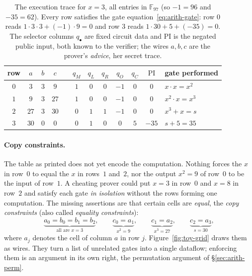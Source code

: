\documentclass[11pt,a4paper]{article}
\theoremstyle{definition}
\newcommand{\F}{\mathbb{F}}
\begin{document}
\begin{table}[htbp]
\centering
\begin{tabular}{c ccc c ccccc c l}
\toprule
row & $a$ & $b$ & $c$ & \phantom{x} & $q_M$ & $q_L$ & $q_R$ & $q_O$ & $q_C$
  & $\mathrm{PI}$ & gate performed \\
\midrule
$0$ & $3$  & $3$ & $9$
  && $1$ & $0$ & $0$ & $-1$ & $0$ & $0$   & $x \cdot x = x^2$ \\
$1$ & $9$  & $3$ & $27$
  && $1$ & $0$ & $0$ & $-1$ & $0$ & $0$   & $x^2 \cdot x = x^3$ \\
$2$ & $27$ & $3$ & $30$
  && $0$ & $1$ & $1$ & $-1$ & $0$ & $0$   & $x^3 + x = s$ \\
$3$ & $30$ & $0$ & $0$
  && $0$ & $1$ & $0$ & $0$  & $5$ & $-35$ & $s + 5 = 35$ \\
\bottomrule
\end{tabular}
\caption{The execution trace for $x = 3$, all entries in $\F_{97}$ (so
$-1 = 96$ and $-35 = 62$). Every row satisfies the gate
equation~\eqref{eq:arith-gate}: row $0$ reads
$1 \cdot 3 \cdot 3 + (-1) \cdot 9 = 0$ and row $3$ reads
$1 \cdot 30 + 5 + (-35) = 0$. The selector columns $q_\bullet$ are fixed
circuit data and $\mathrm{PI}$ is the negated public input, both known to the
verifier; the wires $a, b, c$ are the prover's \emph{advice}, her secret
trace.}
\label{tab:arith-trace}
\end{table}

\paragraph{Copy constraints.}
The table as printed does not yet encode the computation. Nothing forces the $x$
in row~$0$ to equal the $x$ in rows~$1$ and~$2$, nor the output $x^2 = 9$ of
row~$0$ to be the input of row~$1$. A cheating prover could put $x = 3$ in
row~$0$ and $x = 8$ in row~$2$ and satisfy each gate \emph{in isolation} without
the rows forming one computation. The missing assertions are that certain cells
are \emph{equal}, the \emph{copy constraints} (also called \emph{equality
constraints}):
\[
\underbrace{a_0 = b_0 = b_1 = b_2}_{\text{all are } x = 3}, \qquad
\underbrace{c_0 = a_1}_{x^2 = 9}, \qquad
\underbrace{c_1 = a_2}_{x^3 = 27}, \qquad
\underbrace{c_2 = a_3}_{s = 30},
\]
where $a_j$ denotes the cell of column $a$ in row $j$.
Figure~\ref{fig:toy-grid} draws them as wires. They turn a list of
unrelated gates into a single dataflow; enforcing them is an argument in
its own right, the permutation argument of \S\ref{sec:arith-perm}.
\end{document}
